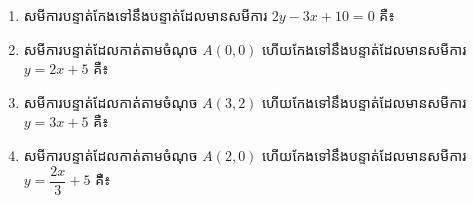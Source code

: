 \begin{enumerate}
\item សមីការបន្ទាត់កែងទៅនឹងបន្ទាត់ដែលមានសមីការ $2y-3x+10=0$ គឺ៖
\begin{enumerate}[label=\alph*.]
\end{enumerate}

\item សមីការបន្ទាត់ដែលកាត់តាមចំណុច $A(0,0)$ ហើយកែងទៅនឹងបន្ទាត់ដែលមានសមីការ $y=2x+5$ គឺ៖
\begin{enumerate}[label=\alph*.]
\end{enumerate}

\item សមីការបន្ទាត់ដែលកាត់តាមចំណុច $A(3,2)$ ហើយកែងទៅនឹងបន្ទាត់ដែលមានសមីការ $y=3x+5$ គឺ៖
\begin{enumerate}[label=\alph*.]
\end{enumerate}

\item សមីការបន្ទាត់ដែលកាត់តាមចំណុច $A(2,0)$ ហើយកែងទៅនឹងបន្ទាត់ដែលមានសមីការ $y=\dfrac{2x}{3}+5$ គឺ៖
\begin{enumerate}[label=\alph*.]
\end{enumerate}


\end{enumerate}
